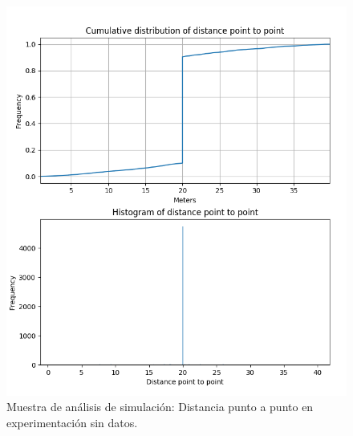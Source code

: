 \begin{figure}[!htb]
\begin{minipage}{0.48\textwidth}
\includegraphics[width=1.2\textwidth]{./Imagenes/SimulateCumulativePointPointEmpty.png}
\caption{Muestra de análisis de simulación: Distancia punto a punto en experimentación sin datos.}
\label{figure:SimulatedPointToPointEmpty}
\end{minipage}
\end{figure}
\newpage

